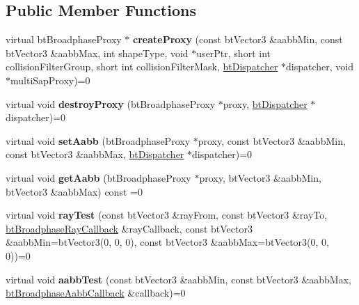 \subsection*{Public Member Functions}
\begin{DoxyCompactItemize}
\item 
\mbox{\label{classbtBroadphaseInterface_abf0cb7dc11f672c4b5d65ef3eee6b77d}} 
virtual bt\+Broadphase\+Proxy $\ast$ {\bfseries create\+Proxy} (const bt\+Vector3 \&aabb\+Min, const bt\+Vector3 \&aabb\+Max, int shape\+Type, void $\ast$user\+Ptr, short int collision\+Filter\+Group, short int collision\+Filter\+Mask, \hyperlink{classbtDispatcher}{bt\+Dispatcher} $\ast$dispatcher, void $\ast$multi\+Sap\+Proxy)=0
\item 
\mbox{\label{classbtBroadphaseInterface_a70f3806d52b97251af59b498947d730d}} 
virtual void {\bfseries destroy\+Proxy} (bt\+Broadphase\+Proxy $\ast$proxy, \hyperlink{classbtDispatcher}{bt\+Dispatcher} $\ast$dispatcher)=0
\item 
\mbox{\label{classbtBroadphaseInterface_a5dafdb7e104b1634202d1b21668a5aa7}} 
virtual void {\bfseries set\+Aabb} (bt\+Broadphase\+Proxy $\ast$proxy, const bt\+Vector3 \&aabb\+Min, const bt\+Vector3 \&aabb\+Max, \hyperlink{classbtDispatcher}{bt\+Dispatcher} $\ast$dispatcher)=0
\item 
\mbox{\label{classbtBroadphaseInterface_a8fc16d360eea987b878ab7fd2efcabe3}} 
virtual void {\bfseries get\+Aabb} (bt\+Broadphase\+Proxy $\ast$proxy, bt\+Vector3 \&aabb\+Min, bt\+Vector3 \&aabb\+Max) const =0
\item 
\mbox{\label{classbtBroadphaseInterface_a516bf7f981dc4540c32c67820de64e0c}} 
virtual void {\bfseries ray\+Test} (const bt\+Vector3 \&ray\+From, const bt\+Vector3 \&ray\+To, \hyperlink{structbtBroadphaseRayCallback}{bt\+Broadphase\+Ray\+Callback} \&ray\+Callback, const bt\+Vector3 \&aabb\+Min=bt\+Vector3(0, 0, 0), const bt\+Vector3 \&aabb\+Max=bt\+Vector3(0, 0, 0))=0
\item 
\mbox{\label{classbtBroadphaseInterface_a19d8d870968460c4a191937a3bb8ecc4}} 
virtual void {\bfseries aabb\+Test} (const bt\+Vector3 \&aabb\+Min, const bt\+Vector3 \&aabb\+Max, \hyperlink{structbtBroadphaseAabbCallback}{bt\+Broadphase\+Aabb\+Callback} \&callback)=0

\end{DoxyCompactItemize}
